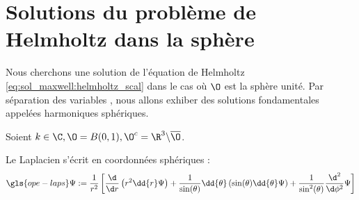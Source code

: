 \section{Solutions du problème de Helmholtz dans la sphère}\label{sec:helmholtz_scal}

Nous cherchons une solution de l'équation de Helmholtz \eqref{eq:sol_maxwell:helmholtz_scal} dans le cas où $\O$ est la sphère unité. Par séparation des variables%
, nous allons exhiber des solutions fondamentales appelées harmoniques sphériques.

Soient $k \in \C, \O = B(0,1), \O^c = \R^3 \backslash \overline{\O}$. 

Le Laplacien s'écrit en coordonnées sphériques : 
\[ 
  \gls{ope-laps} \Psi := \frac{1}{r^2}\left[
  \frac{\d}{\d r}\left(r^2\dd{r}\Psi\right) 
  + \frac{1}{\sin(\theta)}\dd{\theta}\left(\sin(\theta)\dd{\theta}\Psi\right)
  + \frac{1}{\sin^2(\theta)} \frac{\d^2}{\d\phi^2} \Psi \right]
\]

